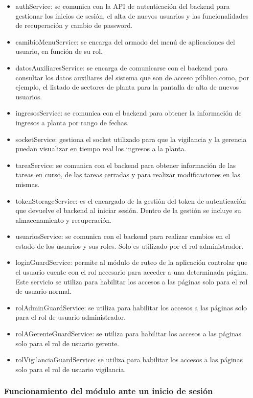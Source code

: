 \begin{itemize}
\item authService: se comunica con la API de autenticación del backend para gestionar los inicios de sesión, el alta de nuevos usuarios y las funcionalidades de recuperación y cambio de password.
\item camibioMenuService: se encarga del armado del menú de aplicaciones del usuario, en función de su rol. 
\item datosAuxiliaresService: se encarga de comunicarse con el backend para consultar los datos auxiliares del sistema que son de acceso público como, por ejemplo, el listado de sectores de planta para la pantalla de alta de nuevos usuarios.
\item ingresosService: se comunica con el backend para obtener la información de ingresos a planta por rango de fechas.
\item socketService: gestiona el socket utilizado para que la vigilancia y la gerencia puedan visualizar en tiempo real los ingresos a la planta.
\item tareaService: se comunica con el backend para obtener información de las tareas en curso, de las tareas cerradas y para realizar modificaciones en las mismas.
\item tokenStorageService: es el encargado de la gestión del token de autenticación que devuelve el backend al iniciar sesión. Dentro de la gestión se incluye su almacenamiento y recuperación.
\item usuariosService: se comunica con el backend para realizar cambios en el estado de los usuarios y sus roles. Solo es utilizado por el rol administrador. 
\item loginGuardService: permite al módulo de ruteo de la aplicación controlar que el usuario cuente con el rol necesario para acceder a una determinada página. Este servicio se utiliza para habilitar los accesos a las páginas solo para el rol de usuario normal.
\item rolAdminGuardService: se utiliza para habilitar los accesos a las páginas solo para el rol de usuario administrador.
\item rolAGerenteGuardService: se utiliza para habilitar los accesos a las páginas solo para el rol de usuario gerente.
\item rolVigilanciaGuardService: se utiliza para habilitar los accesos a las páginas solo para el rol de usuario vigilancia.
\end{itemize}

\subsubsection{Funcionamiento del módulo ante un inicio de sesión}

